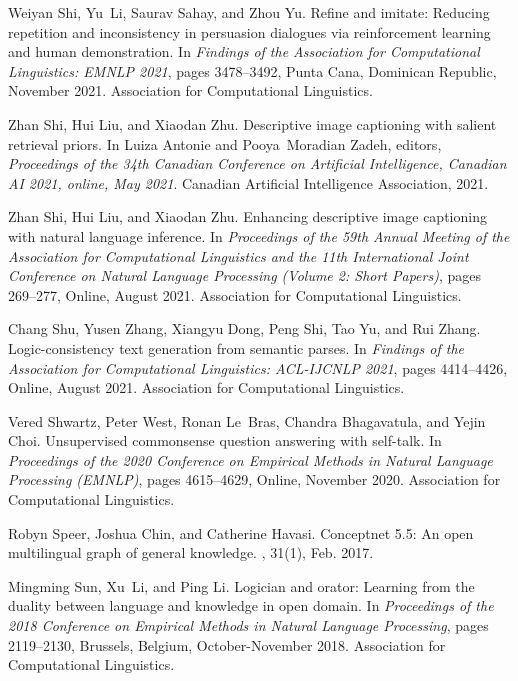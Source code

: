 \documentclass[11pt]{article}
\begin{document}
\begin{thebibliography}{100}
Weiyan Shi, Yu~Li, Saurav Sahay, and Zhou Yu.
\newblock Refine and imitate: Reducing repetition and inconsistency in
  persuasion dialogues via reinforcement learning and human demonstration.
\newblock In {\em Findings of the Association for Computational Linguistics:
  EMNLP 2021}, pages 3478--3492, Punta Cana, Dominican Republic, November 2021.
  Association for Computational Linguistics.

Zhan Shi, Hui Liu, and Xiaodan Zhu.
\newblock Descriptive image captioning with salient retrieval priors.
\newblock In Luiza Antonie and Pooya~Moradian Zadeh, editors, {\em Proceedings
  of the 34th Canadian Conference on Artificial Intelligence, Canadian {AI}
  2021, online, May 2021}. Canadian Artificial Intelligence Association, 2021.

Zhan Shi, Hui Liu, and Xiaodan Zhu.
\newblock Enhancing descriptive image captioning with natural language
  inference.
\newblock In {\em Proceedings of the 59th Annual Meeting of the Association for
  Computational Linguistics and the 11th International Joint Conference on
  Natural Language Processing (Volume 2: Short Papers)}, pages 269--277,
  Online, August 2021. Association for Computational Linguistics.

Chang Shu, Yusen Zhang, Xiangyu Dong, Peng Shi, Tao Yu, and Rui Zhang.
\newblock Logic-consistency text generation from semantic parses.
\newblock In {\em Findings of the Association for Computational Linguistics:
  ACL-IJCNLP 2021}, pages 4414--4426, Online, August 2021. Association for
  Computational Linguistics.

Vered Shwartz, Peter West, Ronan Le~Bras, Chandra Bhagavatula, and Yejin Choi.
\newblock Unsupervised commonsense question answering with self-talk.
\newblock In {\em Proceedings of the 2020 Conference on Empirical Methods in
  Natural Language Processing (EMNLP)}, pages 4615--4629, Online, November
  2020. Association for Computational Linguistics.

Robyn Speer, Joshua Chin, and Catherine Havasi.
\newblock Conceptnet 5.5: An open multilingual graph of general knowledge.
,
  31(1), Feb. 2017.

Mingming Sun, Xu~Li, and Ping Li.
\newblock Logician and orator: Learning from the duality between language and
  knowledge in open domain.
\newblock In {\em Proceedings of the 2018 Conference on Empirical Methods in
  Natural Language Processing}, pages 2119--2130, Brussels, Belgium,
  October-November 2018. Association for Computational Linguistics.


\end{thebibliography}
\end{document}
